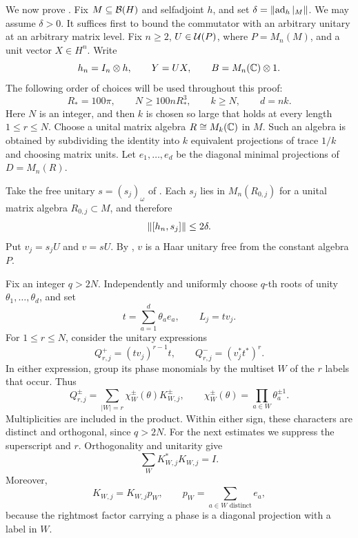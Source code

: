 We now prove . Fix \(M\subseteq\mathcal B(H)\) and
selfadjoint \(h\), and set \(\delta=\lVert\operatorname{ad}_h|_M\rVert\).
We may assume \(\delta>0\). It suffices first to bound the
commutator with an arbitrary unitary at an arbitrary matrix level.
Fix \(n\ge2\), \(U\in\mathcal U(P)\), where \(P=M_n(M)\), and a unit vector
\(X\in H^n\). Write
\[
 h_n=I_n\otimes h,\qquad Y=UX,\qquad
 B=M_n(\mathbb C)\otimes1.
\]
The following order of choices will be used throughout this proof:
\[
 R_*=100\pi,\qquad
 N\ge100nR_*^3,\qquad
 k\ge N,\qquad d=nk.
 \tag{\(\ast\)}\label{eq:amplification-choices}
\]
Here \(N\) is an integer, and then \(k\) is chosen so large that
 holds at every length \(1\le r\le N\).
Choose a unital matrix algebra \(R\cong M_k(\mathbb C)\) in \(M\).
Such an algebra is obtained by subdividing the identity into \(k\)
equivalent projections of trace \(1/k\) and choosing matrix units.
Let \(e_1,\ldots,e_d\) be the diagonal minimal projections of
\(D=M_n(R)\).

Take the free unitary \(s=(s_j)_\omega\) of .
Each \(s_j\) lies in \(M_n(R_{0,j})\) for a unital matrix algebra
\(R_{0,j}\subset M\), and therefore
\begin{equation}\label{eq:cheap-lift-commutator}
 \lVert[h_n,s_j]\rVert\le2\delta.
\end{equation}
Put \(v_j=s_jU\) and \(v=sU\). By , \(v\)
is a Haar unitary free from the constant algebra \(P\).

Fix an integer \(q>2N\). Independently and uniformly choose
\(q\)-th roots of unity \(\theta_1,\ldots,\theta_d\), and set
\[
 t=\sum_{a=1}^d\theta_ae_a,\qquad L_j=tv_j.
\]
For \(1\le r\le N\), consider the unitary expressions
\[
 Q^+_{r,j}=(tv_j)^{r-1}t,\qquad
 Q^-_{r,j}=(v_j^*t^*)^r.
\]
In either expression, group its phase monomials by the multiset
\(W\) of the \(r\) labels that occur. Thus
\[
 Q^\pm_{r,j}=\sum_{|W|=r}\chi^\pm_W(\theta)K^\pm_{W,j},
 \qquad
 \chi^\pm_W(\theta)=\prod_{a\in W}\theta_a^{\pm1}.
\]
Multiplicities are included in the product. Within either sign, these
characters are distinct and orthogonal, since \(q>2N\).
For the next estimates we suppress the superscript and \(r\).
Orthogonality and unitarity give
\begin{equation}\label{eq:coefficient-column}
 \sum_WK_{W,j}^*K_{W,j}=I.
\end{equation}
Moreover,
\begin{equation}\label{eq:coefficient-support}
 K_{W,j}=K_{W,j}p_W,\qquad
 p_W=\sum_{a\in W\text{ distinct}}e_a,
\end{equation}
because the rightmost factor carrying a phase is a diagonal
projection with a label in \(W\).

